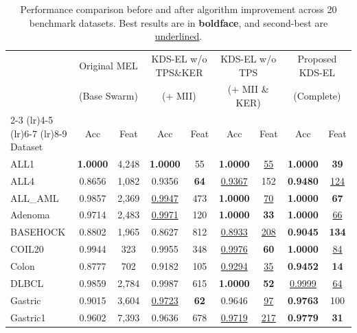 \begin{table}[t]
\centering
\caption{Performance comparison before and after algorithm improvement across 20 benchmark datasets. Best results are in \textbf{boldface}, and second-best are \underline{underlined}.}
\label{T7_prog}\label{tab:ablation_progression}
\begin{tabular}{lcccccccc}
\toprule
& \multicolumn{2}{c}{Original MEL} & \multicolumn{2}{c}{KDS-EL w/o TPS\&KER} & \multicolumn{2}{c}{KDS-EL w/o TPS} & \multicolumn{2}{c}{Proposed KDS-EL} \\
& \multicolumn{2}{c}{(Base Swarm)} & \multicolumn{2}{c}{(+ MII)} & \multicolumn{2}{c}{(+ MII \& KER)} & \multicolumn{2}{c}{(Complete)} \\
\cmidrule(lr){2-3} \cmidrule(lr){4-5} \cmidrule(lr){6-7} \cmidrule(lr){8-9}
Dataset & Acc & Feat & Acc & Feat & Acc & Feat & Acc & Feat \\
\midrule
ALL1             & \textbf{1.0000} & 4{,}248 & \textbf{1.0000} & 55 & \textbf{1.0000} & \underline{55} & \textbf{1.0000} & \textbf{39} \\
ALL4             & 0.8656 & 1{,}082 & 0.9356 & \textbf{64} & \underline{0.9367} & 152 & \textbf{0.9480} & \underline{124} \\
ALL\_AML         & 0.9857 & 2{,}369 & \underline{0.9947} & 473 & \textbf{1.0000} & \underline{70} & \textbf{1.0000} & \textbf{67} \\
Adenoma          & 0.9714 & 2{,}483 & \underline{0.9971} & 120 & \textbf{1.0000} & \textbf{33} & \textbf{1.0000} & \underline{66} \\
BASEHOCK         & 0.8802 & 1{,}965 & 0.8627 & 812 & \underline{0.8933} & \underline{208} & \textbf{0.9045} & \textbf{134} \\
COIL20           & 0.9944 & 323 & 0.9955 & 348 & \underline{0.9976} & \textbf{60} & \textbf{1.0000} & \underline{84} \\
Colon            & 0.8777 & 702 & 0.9182 & 105 & \underline{0.9294} & \underline{35} & \textbf{0.9452} & \textbf{14} \\
DLBCL            & 0.9859 & 2{,}784 & 0.9987 & 615 & \textbf{1.0000} & \textbf{52} & \underline{0.9999} & \underline{64} \\
Gastric          & 0.9015 & 3{,}604 & \underline{0.9723} & \textbf{62} & 0.9646 & \underline{97} & \textbf{0.9763} & 100 \\
Gastric1         & 0.9602 & 7{,}393 & 0.9636 & 678 & \underline{0.9719} & \underline{217} & \textbf{0.9779} & \textbf{31} \\

\end{tabular}
\end{table}
